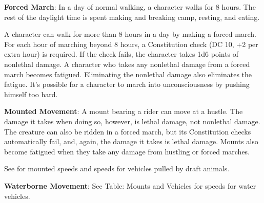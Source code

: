 \textbf{Forced March}: In a day of normal walking, a character walks for 8 hours. The rest of the daylight time is spent making and breaking camp, resting, and eating.

A character can walk for more than 8 hours in a day by making a forced march. For each hour of marching beyond 8 hours, a Constitution check (DC 10, +2 per extra hour) is required. If the check fails, the character takes 1d6 points of nonlethal damage. A character who takes any nonlethal damage from a forced march becomes fatigued. Eliminating the nonlethal damage also eliminates the fatigue. It's possible for a character to march into unconsciousness by pushing himself too hard.

\textbf{Mounted Movement}: A mount bearing a rider can move at a hustle. The damage it takes when doing so, however, is lethal damage, not nonlethal damage. The creature can also be ridden in a forced march, but its Constitution checks automatically fail, and, again, the damage it takes is lethal damage. Mounts also become fatigued when they take any damage from hustling or forced marches.

See  for mounted speeds and speeds for vehicles pulled by draft animals.

\textbf{Waterborne Movement}: See Table: Mounts and Vehicles for speeds for water vehicles.



